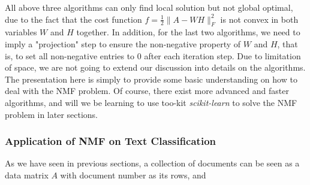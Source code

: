 \documentclass[12pt,letterpaper]{article}
\begin{document}
All above three algorithms can only find local solution but not global optimal, due to the fact that the cost function $f = \frac{1}{2} \|A - WH\|_F^2$ is not convex in both variables $W$ and $H$ together. In addition, for the last two algorithms, we need to imply a "projection" step to ensure the non-negative property of $W$ and $H$, that is, to set all non-negative entries to 0 after each iteration step. Due to limitation of space, we are not going to extend our discussion into details on the algorithms. The presentation here is simply to provide some basic understanding on how to deal with the NMF problem. Of course, there exist more advanced and faster algorithms, and will we be learning to use too-kit \textit{scikit-learn} to solve the NMF problem in later sections. 
\subsubsection{Application of NMF on Text Classification}
As we have seen in previous sections, a collection of documents can be seen as a data matrix $A$ with document number as its rows, and 
\end{document}
